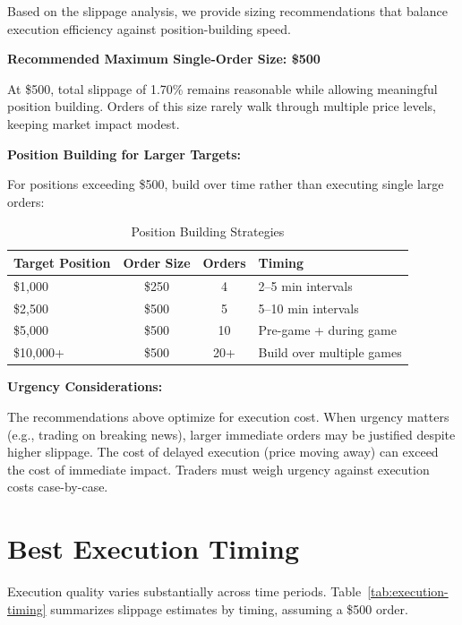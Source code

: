 Based on the slippage analysis, we provide sizing recommendations that balance execution efficiency against position-building speed.

\textbf{Recommended Maximum Single-Order Size: \$500}

At \$500, total slippage of 1.70\% remains reasonable while allowing meaningful position building. Orders of this size rarely walk through multiple price levels, keeping market impact modest.

\textbf{Position Building for Larger Targets:}

For positions exceeding \$500, build over time rather than executing single large orders:

\begin{table}[H]
\centering
\caption{Position Building Strategies}
\label{tab:position-building}
\begin{tabular}{lccl}
\toprule
\textbf{Target Position} & \textbf{Order Size} & \textbf{Orders} & \textbf{Timing} \\
\midrule
\$1,000 & \$250 & 4 & 2--5 min intervals \\
\$2,500 & \$500 & 5 & 5--10 min intervals \\
\$5,000 & \$500 & 10 & Pre-game + during game \\
\$10,000+ & \$500 & 20+ & Build over multiple games \\
\bottomrule
\end{tabular}
\end{table}

\textbf{Urgency Considerations:}

The recommendations above optimize for execution cost. When urgency matters (e.g., trading on breaking news), larger immediate orders may be justified despite higher slippage. The cost of delayed execution (price moving away) can exceed the cost of immediate impact. Traders must weigh urgency against execution costs case-by-case.

\section{Best Execution Timing}

Execution quality varies substantially across time periods. Table~\ref{tab:execution-timing} summarizes slippage estimates by timing, assuming a \$500 order.

